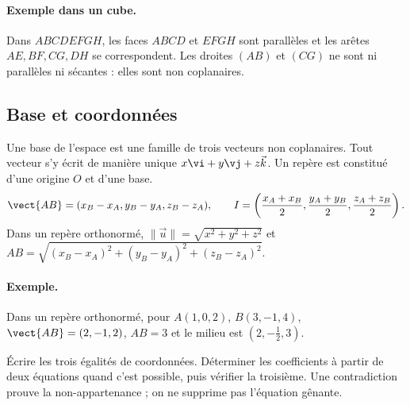 \paragraph{Exemple dans un cube.} Dans $ABCDEFGH$, les faces $ABCD$ et $EFGH$ sont parallèles et les arêtes $AE,BF,CG,DH$ se correspondent. Les droites $(AB)$ et $(CG)$ ne sont ni parallèles ni sécantes : elles sont non coplanaires.
\subsection{Base et coordonnées}
Une base de l'espace est une famille de trois vecteurs non coplanaires. Tout vecteur s'y écrit de manière unique $x\vi +y\vj +z\vec k$. Un repère est constitué d'une origine $O$ et d'une base.
\[\vect{AB}=(x_B-x_A,y_B-y_A,z_B-z_A),\qquad
I=\left(\frac{x_A+x_B}2,\frac{y_A+y_B}2,\frac{z_A+z_B}2\right).\]
Dans un repère orthonormé, $\|\vec u\|=\sqrt{x^2+y^2+z^2}$ et $AB=\sqrt{(x_B-x_A)^2+(y_B-y_A)^2+(z_B-z_A)^2}$.
\paragraph{Exemple.} Dans un repère orthonormé, pour $A(1,0,2)$, $B(3,-1,4)$, $\vect{AB}=(2,-1,2)$, $AB=3$ et le milieu est $(2,-\frac{1}{2},3)$.
\begin{method}
Écrire les trois égalités de coordonnées. Déterminer les coefficients à partir de deux équations quand c'est possible, puis vérifier la troisième. Une contradiction prouve la non-appartenance ; on ne supprime pas l'équation gênante.
\end{method}



